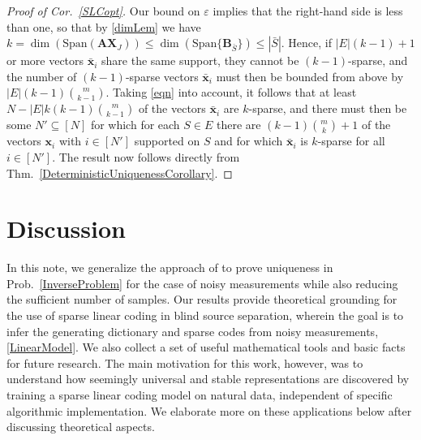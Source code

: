 \documentclass[9pt,twocolumn]{pnas-new}
\begin{document}
\begin{proof}[Proof of Cor.~\ref{SLCopt}]
Our bound on $\varepsilon$ implies that the right-hand side is less than one, so that by \eqref{dimLem} we have $k = \dim(\text{Span}(\mathbf{AX}_J)) \leq \dim(\text{Span}\{\mathbf{B}_{\bar S}\}) \leq |\bar S|$. Hence, if $|E|(k-1) + 1$ or more vectors $\mathbf{\bar x}_i$ share the same support, they cannot be $(k-1)$-sparse, and the number of $(k-1)$-sparse vectors $\mathbf{\bar x}_i$ must then be bounded from above by $|E|(k-1){ m \choose k-1}$. Taking \eqref{eqn} into account, it follows that at least $N - |E|k(k-1){ m \choose k-1}$ of the vectors $\mathbf{\bar  x}_i$ are $k$-sparse, and there must then be some $N' \subseteq [N]$ for which for each $S \in E$ there are $(k-1){m \choose k}+1$ of the vectors $\mathbf{x}_i$ with $i \in [N']$ supported on $S$ and for which $\mathbf{\bar x}_i$ is $k$-sparse for all $i \in [N']$. The result now follows directly from Thm.~\ref{DeterministicUniquenessCorollary}.
\end{proof}


 
\section{Discussion}\label{Discussion}


In this note, we generalize the approach of \cite{Hillar15} to prove uniqueness in Prob.~\ref{InverseProblem} for the case of noisy measurements while also reducing the sufficient number of samples.
Our results provide theoretical grounding for the use of sparse linear coding in blind source separation, wherein the goal is to infer the generating dictionary and sparse codes from noisy measurements, \eqref{LinearModel}.  We also collect a set of useful mathematical tools and basic facts for future research.
The main motivation for this work, however, was to understand how seemingly universal and stable representations are discovered by training a sparse linear coding model on natural data, independent of specific algorithmic implementation.    We elaborate more on these applications below after discussing  theoretical aspects.  %

\end{document}
